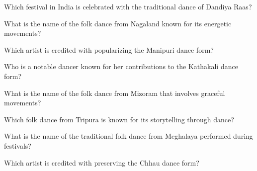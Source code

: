 \documentclass[12pt,a4paper]{book}
\begin{document}
\begin{enhancedmcq}[Question 38]{Which festival in India is celebrated with the traditional dance of Dandiya Raas?}
\end{enhancedmcq}

\begin{enhancedmcq}[Question 39]{What is the name of the folk dance from Nagaland known for its energetic movements?}
\end{enhancedmcq}

\begin{enhancedmcq}[Question 40]{Which artist is credited with popularizing the Manipuri dance form?}
\end{enhancedmcq}

\begin{enhancedmcq}[Question 41]{Who is a notable dancer known for her contributions to the Kathakali dance form?}
\end{enhancedmcq}

\begin{enhancedmcq}[Question 42]{What is the name of the folk dance from Mizoram that involves graceful movements?}
\end{enhancedmcq}

\begin{enhancedmcq}[Question 43]{Which folk dance from Tripura is known for its storytelling through dance?}
\end{enhancedmcq}

\begin{enhancedmcq}[Question 44]{What is the name of the traditional folk dance from Meghalaya performed during festivals?}
\end{enhancedmcq}

\begin{enhancedmcq}[Question 45]{Which artist is credited with preserving the Chhau dance form?}
\end{enhancedmcq}
\end{document}
